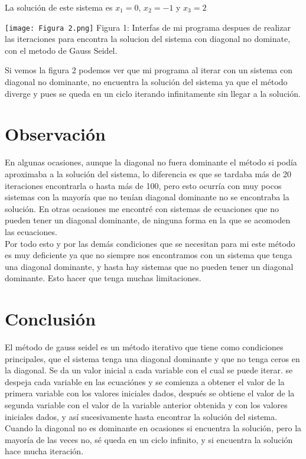\documentclass[12pt]{article}
\begin{document}
			La solución de este sistema es $ x_1 = 0 $, $ x_2 = -1 $ y $ x_3 = 2 $
			\begin{center}
				\texttt{[image: Figura 2.png]}
				Figura 1: Interfas de mi programa despues de realizar las iteraciones para encontra la solucion del sistema con diagonal no dominate, con el metodo de Gauss Seidel.
			\end{center}
			Si vemos la figura 2 podemos ver que mi programa al iterar con un sistema con diagonal no dominante, no encuentra la solución del sistema ya que el método diverge y pues 
			se queda en un ciclo iterando infinitamente sin llegar a la solución.

		\section*{\centering Observación}\label{sec:Observacion}
			En algunas ocasiones, aunque la diagonal no fuera dominante el método si podía aproximaba a 
			la solución del sistema, lo diferencia es que se tardaba más de 20 iteraciones encontrarla o hasta 
			más de 100, pero esto ocurría con muy pocos sistemas con la mayoría que no tenían diagonal 
			dominante no se encontraba la solución.
			En otras ocasiones me encontré con sistemas de ecuaciones que no pueden tener un diagonal 
			dominante, de ninguna forma en la que se acomoden las ecuaciones. \\
			Por todo esto y por las demás condiciones que se necesitan para mi este método es muy 
			deficiente ya que no siempre nos encontramos con un sistema que tenga una diagonal dominante, 
			y hasta hay sistemas que no pueden tener un diagonal dominante. Esto hacer que tenga muchas 
			limitaciones.

		\section*{\centering Conclusión}\label{sec:Conclusion}
			El método de gauss seidel es un método iterativo que tiene como condiciones principales, que el sistema
			tenga una diagonal dominante y que no tenga ceros en la diagonal. Se da un valor inicial a cada 
			variable con el cual se puede iterar. se despeja cada variable en las ecuaciónes y se comienza a 
			obtener el valor de la primera variable con los valores iniciales dados, después se obtiene el valor 
			de la segunda variable con el valor de la variable anterior obtenida y con los valores iniciales 
			dados, y así sucesivamente hasta encontrar la solución del sistema. Cuando la diagonal no es 
			dominante en ocasiones si encuentra la solución, pero la mayoría de las veces no, sé queda en un 
			ciclo infinito, y si encuentra la solución hace mucha iteración.
\end{document}
